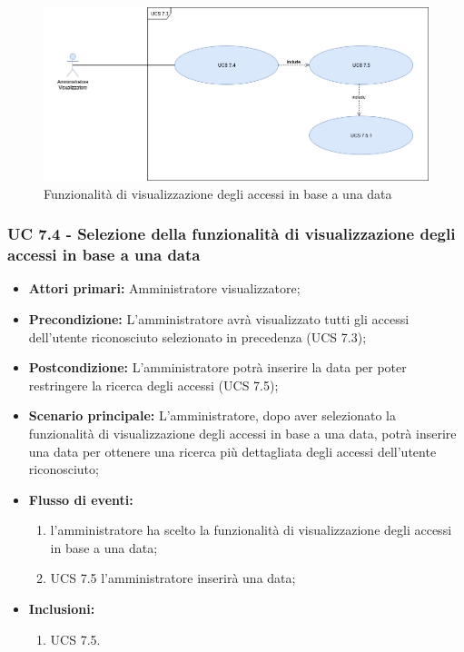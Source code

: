 \begin{figure}[h]
	\centering
	\includegraphics[scale=0.3]{sezioni/UseCase/Immagini/UCS7_1.png}
	\caption{Funzionalità di visualizzazione degli accessi in base a una data }
\end{figure}


\subsubsection{UC 7.4 - Selezione della funzionalità di visualizzazione degli accessi in base a una data }
\begin{itemize}
	\item \textbf{Attori primari:} Amministratore visualizzatore;
	\item \textbf{Precondizione:} L'amministratore avrà visualizzato tutti gli accessi dell'utente riconosciuto selezionato in precedenza (UCS 7.3);
	\item \textbf{Postcondizione:} L'amministratore potrà inserire la data per poter restringere la ricerca degli accessi (UCS 7.5);
	\item \textbf{Scenario principale:} L'amministratore, dopo aver selezionato la funzionalità di visualizzazione degli accessi in base a una data, potrà inserire una data per ottenere una ricerca più dettagliata degli accessi dell'utente riconosciuto;
	\item \textbf{Flusso di eventi:} 
	\begin{enumerate}
		\item l'amministratore ha scelto la funzionalità di visualizzazione degli accessi in base a una data;
		\item UCS 7.5 l'amministratore inserirà una data;
	\end{enumerate}
	\item \textbf{Inclusioni:}
	\begin{enumerate}
		\item UCS 7.5.
	\end{enumerate}
\end{itemize}

